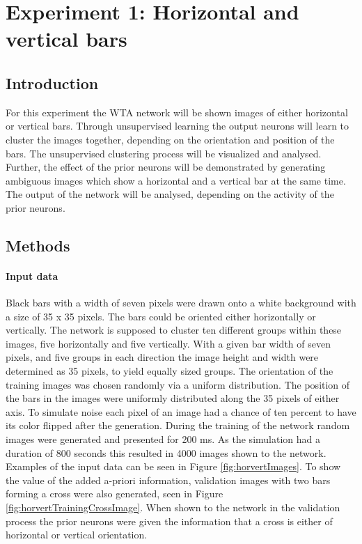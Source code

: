 \section{Experiment 1: Horizontal and vertical bars}
\label{section:horvertAdaptiveInhibition}

\subsection{Introduction}

For this experiment the WTA network will be shown images of either horizontal or vertical bars. Through unsupervised learning the output neurons will learn to cluster the images together, depending on the orientation and position of the bars. The unsupervised clustering process will be visualized and analysed.
Further, the effect of the prior neurons will be demonstrated by generating ambiguous images which show a horizontal and a vertical bar at the same time. The output of the network will be analysed, depending on the activity of the prior neurons. 

\subsection{Methods}

\paragraph{Input data}
Black bars with a width of seven pixels were drawn onto a white background with a size of 35 x 35 pixels. The bars could be oriented either horizontally or vertically. The network is supposed to cluster ten different groups within these images, five horizontally and five vertically. With a given bar width of seven pixels, and five groups in each direction the image height and width were determined as 35 pixels, to yield equally sized groups. The orientation of the training images was chosen randomly via a uniform distribution. The position of the bars in the images were uniformly distributed along the 35 pixels of either axis. To simulate noise each pixel of an image had a chance of ten percent to have its color flipped after the generation.
During the training of the network random images were generated and presented for 200 ms. As the simulation had a duration of 800 seconds this resulted in 4000 images shown to the network. Examples of the input data can be seen in Figure \ref{fig:horvertImages}. To show the value of the added a-priori information, validation images with two bars forming a cross were also generated, seen in Figure \ref{fig:horvertTrainingCrossImage}. When shown to the network in the validation process the prior neurons were given the information that a cross is either of horizontal or vertical orientation.

